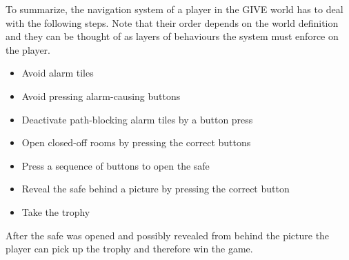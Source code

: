To summarize, the navigation system of a player in the GIVE world has to deal with the following steps. Note that their order depends on the world definition and they can be thought of as layers of behaviours the system must enforce on the player.

\begin{itemize}
\item
Avoid alarm tiles
\item
Avoid pressing alarm-causing buttons
\item
Deactivate path-blocking alarm tiles by a button press
\item
Open closed-off rooms by pressing the correct buttons
\item
Press a sequence of buttons to open the safe
\item
Reveal the safe behind a picture by pressing the correct button
\item
Take the trophy
\end{itemize}

After the safe was opened and possibly revealed from behind the picture the player can pick up the trophy and therefore win the game.